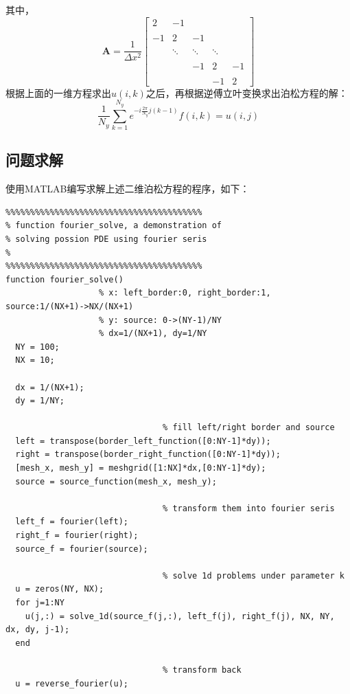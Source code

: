 \documentclass[paper=a4, fontsize=11pt]{scrartcl} %
\numberwithin{equation}{section} %
\numberwithin{figure}{section} %
\numberwithin{table}{section} %
\begin{document}
\begin{CJK*}{UTF8}{gbsn}
其中，
\begin{equation}
\mathbf{A} = \frac{1}{\Delta x^2}\begin{bmatrix}
2 & -1 \\\\
-1 & 2 & -1 \\\\
 & \ddots & \ddots & \ddots \\\\
 & & -1 & 2 & -1 \\\\
 & & & -1 & 2
 \end{bmatrix}
\end{equation}
根据上面的一维方程求出$u(i,k)$之后，再根据逆傅立叶变换求出泊松方程的解：
\begin{equation}
\frac{1}{N_y}\sum_{k=1}^{N_y}e^{-i\frac{2\pi}{N_y}j(k-1)}f(i,k) = u(i,j)
\end{equation}


\subsection{问题求解}
使用MATLAB编写求解上述二维泊松方程的程序，如下：
\lstset{language=MATLAB}
\begin{lstlisting}
%%%%%%%%%%%%%%%%%%%%%%%%%%%%%%%%%%%%%%%%
% function fourier_solve, a demonstration of 
% solving possion PDE using fourier seris
%
%%%%%%%%%%%%%%%%%%%%%%%%%%%%%%%%%%%%%%%%
function fourier_solve()
                   % x: left_border:0, right_border:1, source:1/(NX+1)->NX/(NX+1)
                   % y: source: 0->(NY-1)/NY
                   % dx=1/(NX+1), dy=1/NY
  NY = 100;
  NX = 10;

  dx = 1/(NX+1);
  dy = 1/NY;

                                % fill left/right border and source
  left = transpose(border_left_function([0:NY-1]*dy));
  right = transpose(border_right_function([0:NY-1]*dy));
  [mesh_x, mesh_y] = meshgrid([1:NX]*dx,[0:NY-1]*dy);
  source = source_function(mesh_x, mesh_y);

                                % transform them into fourier seris
  left_f = fourier(left);
  right_f = fourier(right);
  source_f = fourier(source);

                                % solve 1d problems under parameter k
  u = zeros(NY, NX);
  for j=1:NY
    u(j,:) = solve_1d(source_f(j,:), left_f(j), right_f(j), NX, NY, dx, dy, j-1);
  end

                                % transform back
  u = reverse_fourier(u);


\end{lstlisting}
\end{CJK*}
\end{document}
